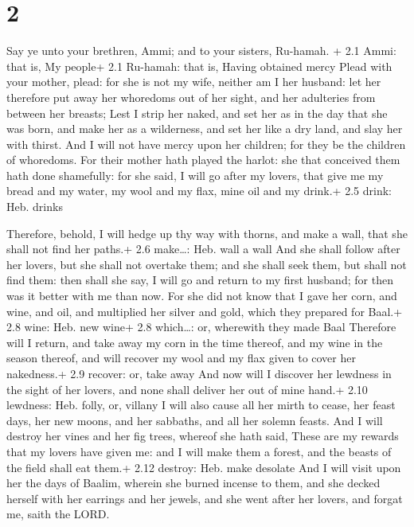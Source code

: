 \hypertarget{section-1}{%
\section{2}\label{section-1}}

 Say ye unto your brethren, Ammi; and to your sisters,
Ru-hamah. + 2.1 Ammi: that is, My people+ 2.1 Ru-hamah: that is, Having
obtained mercy  Plead with your mother, plead: for she is
not my wife, neither am I her husband: let her therefore put away her
whoredoms out of her sight, and her adulteries from between her breasts;
 Lest I strip her naked, and set her as in the day that she
was born, and make her as a wilderness, and set her like a dry land, and
slay her with thirst.  And I will not have mercy upon her
children; for they be the children of whoredoms.  For their
mother hath played the harlot: she that conceived them hath done
shamefully: for she said, I will go after my lovers, that give me my
bread and my water, my wool and my flax, mine oil and my drink.+ 2.5
drink: Heb. drinks

 Therefore, behold, I will hedge up thy way with thorns,
and make a wall, that she shall not find her paths.+ 2.6 make\ldots:
Heb. wall a wall  And she shall follow after her lovers, but
she shall not overtake them; and she shall seek them, but shall not find
them: then shall she say, I will go and return to my first husband; for
then was it better with me than now.  For she did not know
that I gave her corn, and wine, and oil, and multiplied her silver and
gold, which they prepared for Baal.+ 2.8 wine: Heb. new wine+ 2.8
which\ldots: or, wherewith they made Baal  Therefore will I
return, and take away my corn in the time thereof, and my wine in the
season thereof, and will recover my wool and my flax given to cover her
nakedness.+ 2.9 recover: or, take away  And now will I
discover her lewdness in the sight of her lovers, and none shall deliver
her out of mine hand.+ 2.10 lewdness: Heb. folly, or, villany
 I will also cause all her mirth to cease, her feast days,
her new moons, and her sabbaths, and all her solemn feasts.
 And I will destroy her vines and her fig trees, whereof
she hath said, These are my rewards that my lovers have given me: and I
will make them a forest, and the beasts of the field shall eat them.+
2.12 destroy: Heb. make desolate  And I will visit upon her
the days of Baalim, wherein she burned incense to them, and she decked
herself with her earrings and her jewels, and she went after her lovers,
and forgat me, saith the LORD.

